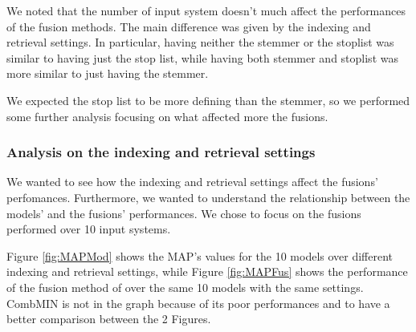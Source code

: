 {	We noted that the number of input system doesn't much affect the performances of the fusion methods. The main difference was given by the indexing and retrieval settings. In particular, having neither the stemmer or the stoplist was similar to having just the stop list, while having both stemmer and stoplist was more similar to just having the stemmer.
	
	We expected the stop list to be more defining than the stemmer, so we performed some further analysis focusing on what affected more the fusions.
	
	\subsubsection{Analysis on the indexing and retrieval settings}
	We wanted to see how the indexing and retrieval settings affect the fusions' perfomances. Furthermore, we wanted to understand the relationship between the models' and the fusions' performances.
	We chose to focus on the fusions performed over 10 input systems. 
	
	Figure \ref{fig:MAPMod} shows the MAP's values for the 10 models over different indexing and retrieval settings, while Figure \ref{fig:MAPFus} shows the performance of the fusion  method of over the same 10 models with the same settings. CombMIN is not in the graph because of its poor performances and to have a better comparison between the 2 Figures.
	
}
